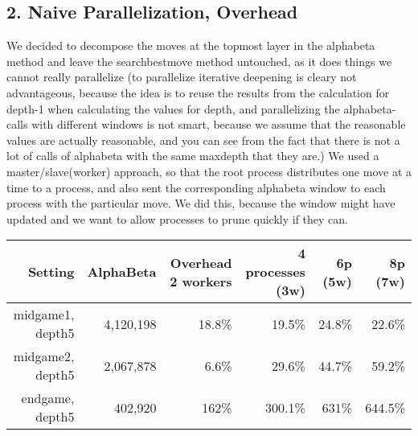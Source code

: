 \subsection*{2. Naive Parallelization, Overhead}
We decided to decompose the moves at the topmost layer in the alphabeta method and leave the searchbestmove method untouched, as it does things we cannot really parallelize (to parallelize iterative deepening is cleary not advantageous, because the idea is to reuse the results from the calculation for depth-1 when calculating the values for depth, and parallelizing the alphabeta-calls with different windows is not smart, because we assume that the reasonable values are actually reasonable, and you can see from the fact that there is not a lot of calls of alphabeta with the same maxdepth that they are.) We used a master/slave(worker) approach, so that the root process distributes one move at a time to a process, and also sent the corresponding alphabeta window to each process with the particular move. We did this, because the window might have updated and we want to allow processes to prune quickly if they can.

\begin{center}
  \begin{tabular}{|r|r|r|r|r|r|}
    \hline
    Setting & AlphaBeta & Overhead 2 workers & 4 processes (3w) & 6p (5w)& 8p (7w)\\ \hline
    midgame1, depth5 & 4,120,198 & 18.8\% & 19.5\% & 24.8\% & 22.6\% \\ \hline
    midgame2, depth5 & 2,067,878 & 6.6\% & 29.6\% & 44.7\% & 59.2\% \\ \hline
    endgame, depth5 & 402,920 & 162\% & 300.1\% & 631\% & 644.5\%  \\ \hline
  \end{tabular}
\end{center}

